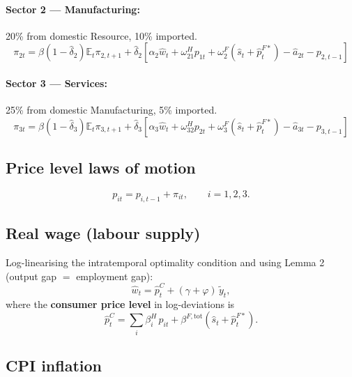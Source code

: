 \documentclass[11pt,a4paper]{article}
\newcommand{\E}{\mathbb{E}}
\newcommand{\wh}[1]{\widehat{#1}}
\providecommand{\tl}[1]{\widetilde{#1}}
\begin{document}
\paragraph{Sector 2 — Manufacturing:} 20\% from domestic Resource, 10\% imported.
\begin{equation}
\pi_{2t}=\beta(1-\wh\delta_2)\E_t\pi_{2,t+1}
+\wh\delta_2\!\left[\alpha_2\wh w_t+\omega^H_{21}p_{1t}+\omega^F_2(\wh s_t+\wh p^{F*}_t)-\wh a_{2t}-p_{2,t-1}\right]
\label{eq:PC2}
\end{equation}

\paragraph{Sector 3 — Services:} 25\% from domestic Manufacturing, 5\% imported.
\begin{equation}
\pi_{3t}=\beta(1-\wh\delta_3)\E_t\pi_{3,t+1}
+\wh\delta_3\!\left[\alpha_3\wh w_t+\omega^H_{32}p_{2t}+\omega^F_3(\wh s_t+\wh p^{F*}_t)-\wh a_{3t}-p_{3,t-1}\right]
\label{eq:PC3}
\end{equation}

\subsection{Price level laws of motion}

\begin{equation}
p_{it}=p_{i,t-1}+\pi_{it},\qquad i=1,2,3.
\label{eq:pLOM}
\end{equation}

\subsection{Real wage (labour supply)}

Log-linearising the intratemporal optimality condition and using Lemma 2
(output gap $=$ employment gap):
\begin{equation}
\wh w_t=\wh p^C_t+(\gamma+\varphi)\,\tl y_t,
\label{eq:labsupply}
\end{equation}
where the \textbf{consumer price level} in log-deviations is
\begin{equation}
\wh p^C_t=\sum_i\beta^H_i\,p_{it}+\beta^{F,\text{tot}}\!(\wh s_t+\wh p^{F*}_t).
\label{eq:CPI_level}
\end{equation}

\subsection{CPI inflation}
\end{document}
